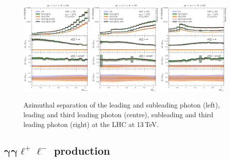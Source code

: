 \begin{figure}[t!]
  \centering
  \includegraphics[width=0.32\textwidth]{figs_aaw/dphi_y1_y2}
  \includegraphics[width=0.32\textwidth]{figs_aaw/dphi_y1_l1}
  \includegraphics[width=0.32\textwidth]{figs_aaw/dphi_y2_l1}
  \caption{
    Azimuthal separation of the leading and subleading photon (left),
    leading and third leading photon (centre), subleading and third leading 
    photon (right) at the LHC at 13\,TeV.\\
    \label{fig:aaw:dphi}
  }
\end{figure}


\subsection{\texorpdfstring{$\boldsymbol{\gamma\gamma\ell^+\ell^-}$}{aall} production}
\label{sec:results:aaz}

